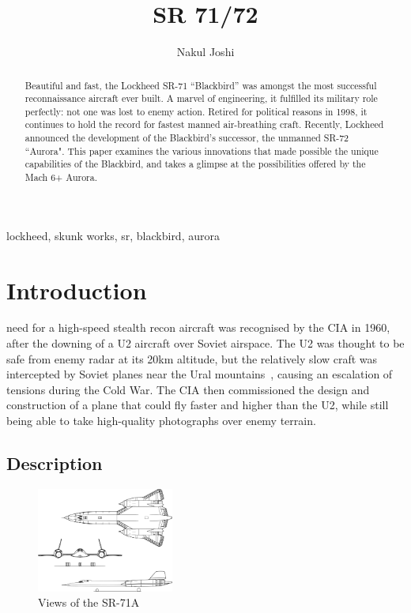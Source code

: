 \documentclass[12pt, draftclsnofoot, onecolumn, doublespaced]{IEEEtran}
\title{SR 71/72}
\author{Nakul Joshi}
\begin{document}
\maketitle

\begin{abstract}
	Beautiful and fast, the Lockheed SR-71 ``Blackbird'' was amongst the most successful reconnaissance aircraft ever built. A marvel of engineering, it fulfilled its military role perfectly: not one was lost to enemy action. Retired for political reasons in 1998, it continues to hold the record for fastest manned air-breathing craft. Recently, Lockheed announced the development of the Blackbird's successor, the unmanned SR-72 ``Aurora". This paper examines the various innovations that made possible the unique capabilities of the Blackbird, and takes a glimpse at the possibilities offered by the Mach 6+ Aurora.
\end{abstract}

\begin{IEEEkeywords} lockheed, skunk works, sr, blackbird, aurora \end{IEEEkeywords}



\section{Introduction}

	 need for a high-speed stealth recon aircraft was recognised by the CIA in 1960, after the downing of a U2 aircraft over Soviet airspace. The U2 was thought to be safe from enemy radar at its 20km altitude, but the relatively slow craft was intercepted by Soviet planes near the Ural mountains~\cite{u2}, causing an escalation of tensions during the Cold War. The CIA then commissioned the design and construction of a plane that could fly faster and higher than the U2, while still being able to take high-quality photographs over enemy terrain.
	
	\subsection{Description}
	\begin{figure}[h]
		\centering
		\includegraphics[width=0.4\textwidth]{view.pdf}
		\caption{Views of the SR-71A}
	\end{figure}
\end{document}
